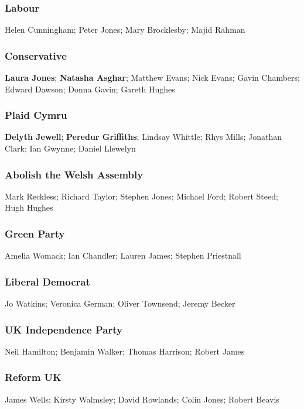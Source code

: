\begin{resultsiii}

\subsubsection*{Labour}
Helen Cunningham; Peter Jones; Mary Brocklesby; Majid Rahman

\subsubsection*{Conservative}
\textbf{Laura Jones}; \textbf{Natasha Asghar}; Matthew Evans; Nick Evans; Gavin Chambers; Edward Dawson; Donna Gavin; Gareth Hughes

\subsubsection*{Plaid Cymru}
\textbf{Delyth Jewell}; \textbf{Peredur Griffiths}; Lindsay Whittle; Rhys Mills; Jonathan Clark; Ian Gwynne; Daniel Llewelyn

\subsubsection*{Abolish the Welsh Assembly}
Mark Reckless; Richard Taylor; Stephen Jones; Michael Ford; Robert Steed; Hugh Hughes

\subsubsection*{Green Party}
Amelia Womack; Ian Chandler; Lauren James; Stephen Priestnall

\subsubsection*{Liberal Democrat}
Jo Watkins; Veronica German; Oliver Townsend; Jeremy Becker

\subsubsection*{UK Independence Party}
Neil Hamilton; Benjamin Walker; Thomas Harrison; Robert James

\subsubsection*{Reform UK}
James Wells; Kirsty Walmsley; David Rowlands; Colin Jones; Robert Beavis


\end{resultsiii}
